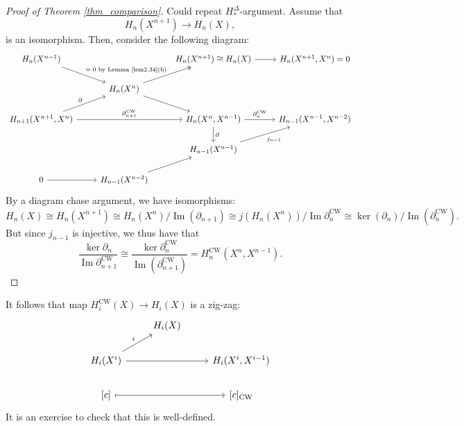 \documentclass[a4paper]{report}
\theoremstyle{definition}
\theoremstyle{remark}
\theoremstyle{proposition}
\theoremstyle{conjecture}
\theoremstyle{lemma}
\theoremstyle{corollary}
\theoremstyle{exercise}
\newcommand{\on}{\operatorname}
\begin{document}
\begin{proof}[Proof of Theorem \ref{thm_comparison}]
    Could repeat $H_\ast^\Delta$-argument. Assume that $$H_n(X^{n+1}) \longrightarrow H_n(X),$$ 
    is an isomorphism. Then, consider the following diagram:
    $$\begin{tikzcd}
        H_n(X^{n-1}) \arrow[rd, "\text{$=0$ by Lemma \ref{lem2.34}(b)}"]                     &                                           & H_n(X^{n+1}) \cong H_n(X) \arrow[r]                                        & {H_n(X^{n+1},X^n) = 0}     \\
                                                                                             & H_n(X^n) \arrow[ru, two heads] \arrow[rd] &                                                                            &                            \\
        {H_{n+1}(X^{n+1},X^n)} \arrow[ru, "\partial"] \arrow[rr, "\partial_{n+1}^{\on{CW}}"] &                                           & {H_n(X^n,X^{n-1})} \arrow[r, "\partial_n^{\on{CW}}"] \arrow[d, "\partial"] & {H_{n-1}(X^{n-1},X^{n-2})} \\
                                                                                             &                                           & H_{n-1}(X^{n-1}) \arrow[ru, "j_{n-1}"']                                    &                            \\
        0 \arrow[r]                                                                          & H_{n-1}(X^{n-2}) \arrow[ru]               &                                                                            &                           
    \end{tikzcd}$$
    By a diagram chase argument, we have isomorphisms:
    $$H_n(X) \cong H_n(X^{n+1}) \cong H_n(X^n)/ \on{Im}(\partial_{n+1}) \cong j (H_n(X^n)) / \on{Im}\partial_n^{\on{CW}} \cong \ker (\partial_n)/\on{Im}(\partial_n^{\on{CW}}).$$
    But since $j_{n-1}$ is injective, we thus have that $$\frac{\ker\partial_n}{\on{Im}\partial_{n+1}^{\on{CW}}} \cong \frac{\ker\partial_n^{\on{CW}}}{\on{Im}(\partial_{n+1}^{\on{CW}})} = H_n^{\on{CW}}(X^n,X^{n-1}).$$
\end{proof}

It follows that map $H_i^{\on{CW}}(X) \to H_i(X)$ is a zig-zag:
$$\begin{tikzcd}
    & H_i(X) &                    \\
    H_i(X^i) \arrow[ru, "i"] \arrow[rr] &        & {H_i(X^i,X^{i-1})} \\
    {[c]} \arrow[rr, maps to]           &        & {[c]_{\on{CW}}}   
\end{tikzcd}$$ It is an exercise to check that this is well-defined.
\end{document}
